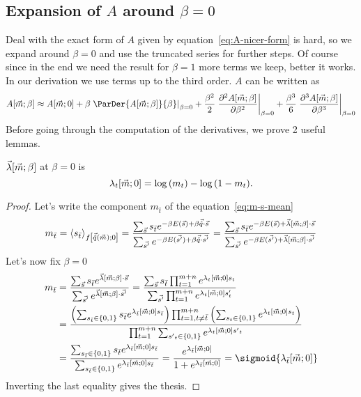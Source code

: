 \subsection[Expansion of A around \textbeta=0]{Expansion of \(A\) around \(\beta=0\)}
Deal with the exact form of \(A\) given by equation~\eqref{eq:A-nicer-form} is hard,
so we expand around \(\beta = 0\) and use the truncated series for further steps.
Of course since in the end we need the result for \(\beta=1\) more terms we keep, better
it works. In our derivation we use terms up to the third order.
\(A\) can be written as
\[
  A{\left[\vec{m};\beta\right]} \approx
    A{\left[\vec{m};0\right]} + 
    \beta \left.\ParDer{A{\left[\vec{m};\beta\right]}}{\beta}\right|_{\beta=0} +
    \frac{\beta^2}{2}
      \left.\frac{\partial^2A{\left[\vec{m};\beta\right]}}{\partial\beta^2}\right|_{\beta=0}+
    \frac{\beta^3}{6} 
      \left.\frac{\partial^3A{\left[\vec{m};\beta\right]}}{\partial\beta^3}\right|_{\beta=0}    
\]
Before going through the computation of the derivatives, we prove 2 useful lemmas.
\begin{lemma} \label{lem:lambda-t-zero}
  \(\vec{\lambda}{\left[\vec{m};\beta\right]}\) at \(\beta = 0\) is
  \[
    \lambda_t{\left[\vec{m};0\right]} = \log{\left(m_t\right)} - \log{\left(1-m_t\right)}.
  \]
  \begin{proof}
    Let's write the component \(m_{\bar{t}}\) of the equation~\eqref{eq:m-s-mean}
    \[
      m_{\bar{t}} = \left\langle s_{\bar{t}}\right\rangle_{f{\left[\vec{\hat{q}}{(\vec{m})};0\right]}}
      = \frac{\sum_{\vec{s}} s_{\bar{t}} e^{-\beta E(\vec{s}) + \beta \vec{\hat{q}}\cdot\vec{s}}}
             {\sum_{\vec{s'}}e^{-\beta E(\vec{s'}) + \beta \vec{\hat{q}}\cdot\vec{s'}}}
      = \frac{\sum_{\vec{s}} s_{\bar{t}} e^{-\beta E(\vec{s}) + \vec{\lambda}{\left[\vec{m};\beta\right]}\cdot\vec{s}}}
             {\sum_{\vec{s'}}e^{-\beta E(\vec{s'}) + \vec{\lambda}{\left[\vec{m};\beta\right]}\cdot\vec{s'}}}
    \]
    Let's now fix \(\beta=0\)
    \begin{align*} \displaystyle
      m_{\bar{t}} &= \frac{\sums s_{\bar{t}} e^{\Lambd{\vec{m}}{\beta}\cdot\vec{s}}}
                          {\sum_{\vec{s'}}e^{\Lambd{\vec{m}}{\beta}\cdot\vec{s'}}} 
                   = \frac{\sums s_{\bar{t}} \prodt e^{\lgtmz s_t}}
                          {\sum_{\vec{s'}}\prodt e^{\lgtmz s'_t}} \\
                  &= \frac{\left(\sumstbar s_{\bar{t}}e^{\lgtbarmz s_{\bar{t}}}\right)
                           \prod_{t=1,t\neq{\bar{t}}}^{m+n}\left(\sumst e^{\lgtmz s_t}\right)}
                          {\prodt\sumstprim e^{\lgtmz {s'}_t}} \\
                  &= \frac{\sumstbar s_{\bar{t}}e^{\lgtbarmz s_{\bar{t}}}}
                          {\sumstbar e^{\lgtbarmz s_{\bar{t}}}}
                   = \frac{e^{\lgtbarmz}}{1+e^{\lgtbarmz}} = \sigmoid{\lgtbarmz}              
    \end{align*}
    Inverting the last equality gives the thesis.
  \end{proof}
\end{lemma}
